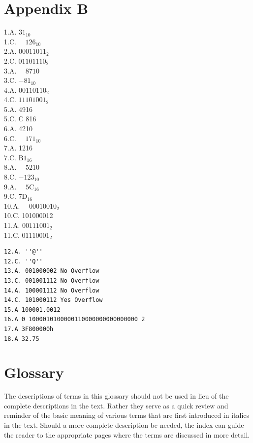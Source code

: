 \documentclass[10pt]{book}
\begin{document}
\begin{center}
\begin{center}
\begin{center}
\begin{center}
\begin{center}
\section*{Appendix B}
1.A. $31_{10}$\\
1.C. $\quad 126_{10}$\\
2.A. $00011011_{2}$\\
2.C. $01101110_{2}$\\
3.A. $\quad 8710$\\
3.C. $-81_{10}$\\
4.A. $00110110_{2}$\\
4.C. $11101001_{2}$\\
5.A. 4916\\
5.C. C 816\\
6.A. 4210\\
6.C. $\quad 171_{10}$\\
7.A. 1216\\
7.C. $\mathrm{B} 1_{16}$\\
8.A. $\quad 5210$\\
8.C. $-123_{10}$\\
9.A. $\quad 5 \mathrm{C}_{16}$\\
9.C. $7 \mathrm{D}_{16}$\\
10.A. $\quad 00010010_{2}$\\
10.C. 101000012\\
11.A. $00111001_{2}$\\
11.C. $01110001_{2}$

\begin{verbatim}
12.A. ''@''
12.C. ''Q''
13.A. 001000002 No Overflow
13.C. 001001112 No Overflow
14.A. 100001112 No Overflow
14.C. 101000112 Yes Overflow
15.A 100001.0012
16.A 0 1000010100000110000000000000000 2
17.A 3F800000h
18.A 32.75
\end{verbatim}

\section*{Glossary}
The descriptions of terms in this glossary should not be used in lieu of the complete descriptions in the text. Rather they serve as a quick review and reminder of the basic meaning of various terms that are first introduced in italics in the text. Should a more complete description be needed, the index can guide the reader to the appropriate pages where the terms are discussed in more detail.



\end{center}
\end{center}
\end{center}
\end{center}
\end{center}
\end{document}
